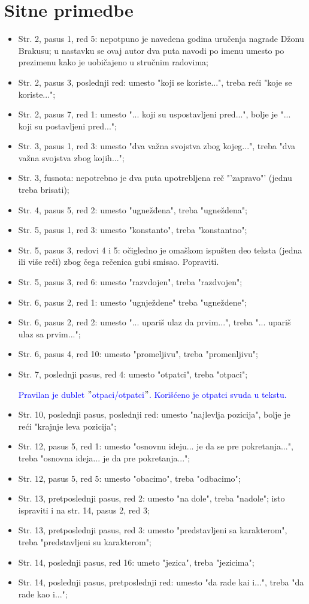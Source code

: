 \documentclass[a4paper]{report}
\newcommand{\odgovor}[1]{\textcolor{blue}{#1}}
\begin{document}
\section{Sitne primedbe}
\begin{itemize}
  \item Str. 2, pasus 1, red 5: nepotpuno je navedena godina uručenja nagrade Džonu Brakusu; u nastavku se ovaj autor dva puta navodi po imenu umesto po prezimenu kako je uobičajeno u stručnim radovima;
  \item Str. 2, pasus 3, poslednji red: umesto "koji se koriste...", treba reći "koje se koriste...";
   \item Str. 2, pasus 7, red 1: umesto "... koji su uspostavljeni pred...", bolje je "... koji su postavljeni pred..."; 
   \item Str. 3, pasus 1, red 3: umesto "dva važna svojstva zbog kojeg...", treba "dva važna svojstva zbog kojih...";
   \item Str. 3, fusnota: nepotrebno je dva puta upotrebljena reč "'zapravo"' (jednu treba brisati);
   \item Str. 4, pasus 5, red 2: umesto "ugnežđena", treba "ugneždena";
   \item Str. 5, pasus 1, red 3: umesto "konstanto", treba "konstantno";
   \item Str. 5, pasus 3, redovi 4 i 5: očigledno je omaškom ispušten deo teksta (jedna ili više reči) zbog čega rečenica gubi smisao. Popraviti.
   \item Str. 5, pasus 3, red 6: umesto "razvdojen", treba "razdvojen";
   \item Str. 6, pasus 2, red 1: umesto "ugnježdene" treba "ugneždene";
   \item Str. 6, pasus 2, red 2: umesto "... upariš ulaz da prvim...", treba "... upariš ulaz sa prvim...";
   \item Str. 6, pasus 4, red 10: umesto "promeljivu", treba "promenljivu";
   \item Str. 7, poslednji pasus, red 4: umesto "otpatci", treba "otpaci";
   
\odgovor{Pravilan je dublet $"$otpaci/otpatci$"$. Korišćeno je otpatci svuda u tekstu.}
   \item Str. 10, poslednji pasus, poslednji red: umesto "najlevlja pozicija", bolje je reći "krajnje leva pozicija";
   \item Str. 12, pasus 5, red 1: umesto "osnovnu ideju... je da se pre pokretanja...", treba "osnovna ideja... je da pre pokretanja...";
   \item Str. 12, pasus 5, red 5: umesto "obacimo", treba "odbacimo";
   \item Str. 13, pretposlednji pasus, red 2: umesto "na dole", treba "nadole"; isto ispraviti i na str. 14, pasus 2, red 3;
   \item Str. 13, pretposlednji pasus, red 3: umesto "predstavljeni sa karakterom", treba "predstavljeni su karakterom";
   \item Str. 14, poslednji pasus, red 16: umeto "jezica", treba "jezicima";
   \item Str. 14, poslednji pasus, pretposlednji red: umesto "da rade kai i...", treba "da rade kao i...";      
\end{itemize}
\end{document}
